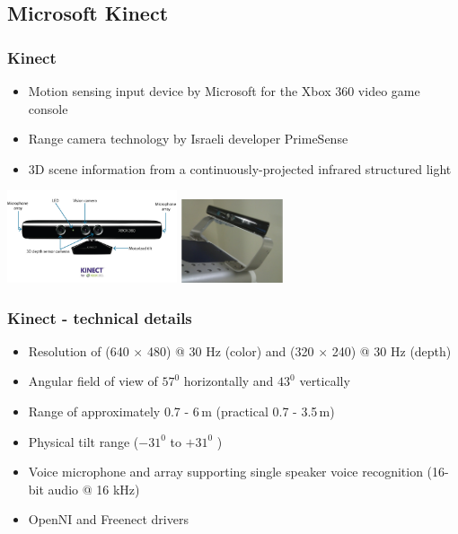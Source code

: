 \subsection{Microsoft Kinect}
\begin{frame} 
 \frametitle{Kinect}
\begin{itemize}
 \item Motion sensing input device by Microsoft for the Xbox 360 video game console
 \item Range camera technology by Israeli developer PrimeSense
 \item 3D scene information from a continuously-projected infrared structured light
\end{itemize}
\hspace{7ex}\includegraphics[width=5cm]{../images/Kinect-resized.png} \hspace{1ex}
\includegraphics[width=3cm]{../images/PR2_Kinect_spoiler2.jpeg}
\end{frame}

\begin{frame}
 \frametitle{Kinect - technical details}
\begin{itemize}
  \item Resolution of (640 $\times$ 480) @ 30 Hz (color) and (320 $\times$ 240) @ 30 Hz (depth)
  \item Angular field of view of $57^0$ horizontally and $43^0$ vertically
  \item Range of approximately 0.7 - 6\,m (practical 0.7 - 3.5\,m)
  \item Physical tilt range ($-31^0$  to $+31^0$ )
  \item Voice microphone and array supporting single speaker voice recognition (16-bit audio @ 16 kHz)
  \item OpenNI and Freenect drivers
\end{itemize}

\end{frame}

